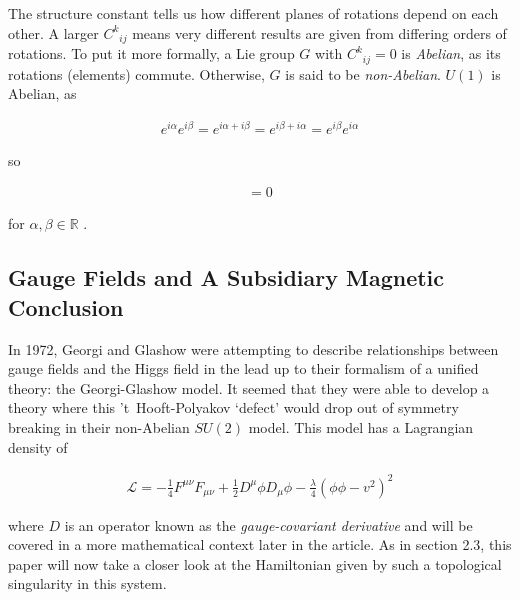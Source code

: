 \documentclass[fleqn, twocolumn, 10pt]{article}
\begin{document}
The structure constant tells us how different planes of rotations depend on each other. A larger $C^k{}_{ij}$ means very different results are given from differing orders of rotations. To put it more formally, a Lie group $G$ with $C^k{}_{ij} = 0$ is \textit{Abelian}, as its rotations (elements) commute. Otherwise, $G$ is said to be \textit{non-Abelian}. $U(1)$ is Abelian, as 

\begin{ceqn}
\begin{align*}
e^{i\alpha}e^{i\beta} = e^{i\alpha + i\beta} = e^{i\beta + i\alpha} = e^{i\beta}e^{i\alpha}
\end{align*}
\end{ceqn}
so 

\begin{ceqn}
\begin{align*}
[e^{i\alpha}, e^{i\beta}] = 0
\end{align*}
\end{ceqn}
for $\alpha, \beta \in \mathbb{R}$ \cite{schwartz2014quantum, robert2007gilmore, maggiore2005modern}.   



\subsection{Gauge Fields and A Subsidiary Magnetic Conclusion}

In 1972, Georgi and Glashow were attempting to describe relationships between gauge fields and the Higgs field in the lead up to their formalism of a unified theory: the Georgi-Glashow model. It seemed that they were able to develop a theory where this 't~Hooft-Polyakov `defect' would drop out of symmetry breaking in their non-Abelian $SU(2)$ model. This model has a Lagrangian density of \cite{leblancspontaneous, shnir, georgi1974unity} 

\begin{ceqn}
\begin{align}\tag{7}
\mathcal{L} = -\frac{1}{4}F^{\mu\nu}F_{\mu\nu} + \frac{1}{2} D^\mu \phi D_\mu \phi - \frac{\lambda}{4}(\phi \phi - v^2)^2
\end{align}
\end{ceqn}
where $D$ is an operator known as the \textit{gauge-covariant derivative} and will be covered in a more mathematical context later in the article. As in section 2.3, this paper will now take a closer look at the Hamiltonian given by such a topological singularity in this system.
\end{document}
